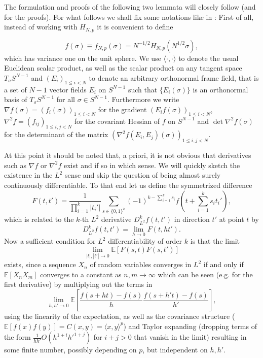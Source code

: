 The formulation and proofs of the following two lemmata will closely follow \cite{Cerny10} (and \cite{Adler07} for the proofs). For what follows we shall fix some notations like in \cite{Cerny10}:
First of all, instead of working with $H_{N,p}$ it is convenient to define

\begin{equation}\label{def:rescaledHamiltonian}
	f(\sigma)\equiv f_{N,p}(\sigma)=N^{-1/2}H_{N,p}(N^{1/2}\sigma),
\end{equation}
which has variance one on the unit sphere. We use $\langle\cdot,\cdot\rangle$ to denote the usual Euclidean scalar product, as well as the scalar product on any tangent space $T_\sigma S^{N-1}$ and $(E_i)_{1\leq i<N}$ to denote an arbitrary orthonormal frame field, that is a set of $N-1$ vector fields $E_i$ on $S^{N-1}$ such that $\{E_i(\sigma)\}$ is an orthonormal basis of $T_\sigma S^{N-1}$ for all $\sigma\in S^{N-1}$. Furthermore we write $\nabla f(\sigma)=(f_i(\sigma))_{1\leq i<N}$ for the gradient $(E_i f(\sigma))_{1\leq i<N}$, $\nabla^2 f = (f_{ij})_{1\leq i,j<N}$ for the covariant Hessian of $f$ on $S^{N-1}$ and $\det\nabla^2 f(\sigma)$ for the determinant of the matrix \newline$(\nabla^2 f(E_i,E_j)(\sigma))_{1\leq i,j<N}$.

At this point it should be noted that, a priori, it is not obvious that derivatives such as $\nabla f$ or $\nabla^2 f$ exist and if so in which sense. We will quickly sketch the existence in the $L^2$ sense and skip the question of being almost surely continuously differentiable. To that end let us define the symmetrized difference
$$F(t,t') = \frac{1}{\prod_{i=1}^k |t_i'|}\sum_{s\in\{0,1\}^k}(-1)^{k-\sum_{i=1}^k s_i}f\left(t+\sum_{i=1}^k s_i t_i'\right),$$
which is related to the $k$-th $L^2$ derivative $D_{L^2}^k f(t,t')$ in direction $t'$ at point $t$ by
$$D_{L^2}^k f(t,t') = \lim_{h\rightarrow 0} F(t,ht').$$
Now a sufficient condition for $L^2$ differentiability of order $k$ is that the limit $$\lim_{|t|,|t'|\rightarrow 0}\mathbb E[F(s,t)F(s,t')]$$
exists, since a sequence $X_n$ of random variables converges in $L^2$ if and only if $\mathbb E[X_nX_m]$ converges to a constant as $n,m\rightarrow\infty$ which can be seen (e.g. for the first derivative) by multiplying out the terms in $$\lim_{h,h'\rightarrow 0}\mathbb E\left[\frac{f(s+ht)-f(s)}{h}\frac{f(s+h't)-f(s)}{h'}\right],$$ using the linearity of the expectation, as well as the covariance structure ($\mathbb E[f(x)f(y)]=C(x,y)=\langle x,y\rangle^p$) and Taylor expanding (dropping terms of the form $\frac{1}{hh'}O(h^{1+i}h'^{1+j})$ for $i+j>0$ that vanish in the limit) resulting in some finite number, possibly depending on $p$, but independent on $h,h'$.

